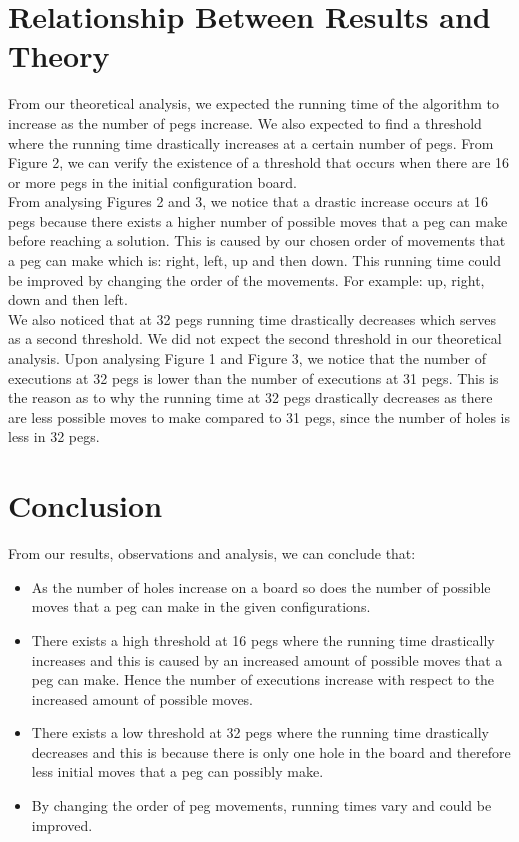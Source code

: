 \documentclass{article}
\begin{document}
\section{Relationship Between Results and Theory}
From our theoretical analysis, we expected the running time of the algorithm to increase as the number of pegs increase. We also expected to find a threshold where the running time drastically increases at a certain number of pegs. From Figure 2, we can verify the existence of a threshold that occurs when there are 16 or more pegs in the initial configuration board. 
\\From analysing Figures 2 and 3, we notice that a drastic increase occurs at 16 pegs because there exists a higher number of possible moves that a peg can make before reaching a solution. This is caused by our chosen order of movements that a peg can make which is: right, left, up and then down.
This running time could be improved by changing the order of the movements. For example: up, right, down and then left.
\\We also noticed that at 32 pegs running time drastically decreases which serves as a second threshold. We did not expect the second threshold in our theoretical analysis. Upon analysing Figure 1 and Figure 3, we notice that the number of executions at 32 pegs is lower than the number of executions at 31 pegs. This is the reason as to why the running time at 32 pegs drastically decreases as there are less possible moves to make compared to 31 pegs, since the number of holes is less in 32 pegs.

\section{Conclusion}
From our results, observations and analysis, we can conclude that:
\begin{itemize}
\item As the number of holes increase on a board so does the number of possible moves that a peg can make in the given configurations.
\item There exists a high threshold at 16 pegs where the running time drastically increases and this is caused by an increased amount of possible moves that a peg can make. Hence the number of executions increase with respect to the increased amount of possible moves.
\item  There exists a low threshold at 32 pegs where the running time drastically decreases and this is because there is only one hole in the board and therefore less initial moves that a peg can possibly make.
\item By changing the order of peg movements, running times vary and could be improved.
\end{itemize}
\end{document}
